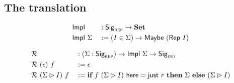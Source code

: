 \subsection{The translation}

\begin{figure}[H]
  \begin{alignat*}{2}
  & \mta{Impl} &&: \Sig_\rep \to \Set \\
  & \mta{Impl}\ \Sigma &&:= (I \in \Sigma) \to \mta{Maybe}\ (\Rep\ I)
  \end{alignat*}
\end{figure}

\begin{figure}[H]
  \begin{alignat*}{2}
  & \mathcal{R} &&: (\Sigma : \textsf{Sig}_{\textsc{rep}}) \to \textsf{Impl}\ \Sigma \to \textsf{Sig}_{\textsc{ind}} \\
  & \mathcal{R}\ (\epsilon)\ f &&:= \epsilon \\
  & \mathcal{R}\ (\Sigma \rhd I)\ f &&:= \textbf{if}\ f\ (\Sigma \rhd I)\ \textsf{here} = \textsf{just}\ r\ \textbf{then}\ \Sigma\ \textbf{else}\ (\Sigma \rhd I) \\
  \end{alignat*}
\end{figure}

